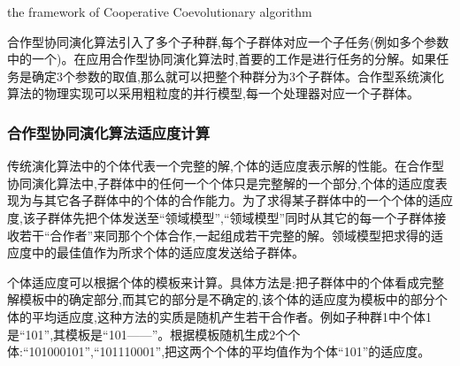 \documentclass[a4paper]{article}
\begin{document}
    \begin{algorithm}[H]
        
        \caption{the framework of Cooperative Coevolutionary algorithm}
        \label{alg2}
        \onehalfspacing

        \begin{algorithmic}[1]
            \EndFor
                \EndFor
            \EndFor
            \EndFor
        \end{algorithmic}

    \end{algorithm}

    合作型协同演化算法引入了多个子种群,每个子群体对应一个子任务(例如多个参数中的一个)。在应用合作型协同演化算法时,首要的工作是进行任务的分解。如果任务是确定3个参数的取值,那么就可以把整个种群分为3个子群体。合作型系统演化算法的物理实现可以采用粗粒度的并行模型,每一个处理器对应一个子群体。

    \subsubsection{合作型协同演化算法适应度计算}

    传统演化算法中的个体代表一个完整的解,个体的适应度表示解的性能。在合作型协同演化算法中,子群体中的任何一个个体只是完整解的一个部分,个体的适应度表现为与其它各子群体中的个体的合作能力。为了求得某子群体中的一个个体的适应度,该子群体先把个体发送至“领域模型”,“领域模型”同时从其它的每一个子群体接收若干“合作者”来同那个个体合作,一起组成若干完整的解。领域模型把求得的适应度中的最佳值作为所求个体的适应度发送给子群体。
    
    个体适应度可以根据个体的模板来计算。具体方法是:把子群体中的个体看成完整解模板中的确定部分,而其它的部分是不确定的,该个体的适应度为模板中的部分个体的平均适应度,这种方法的实质是随机产生若干合作者。例如子种群1中个体1是“101”,其模板是“101------”。根据模板随机生成2个个体:“101000101”,“101110001”,把这两个个体的平均值作为个体“101”的适应度。
    
\end{document}
